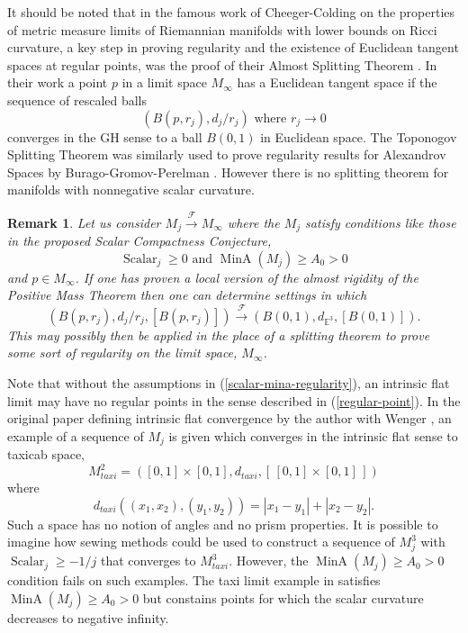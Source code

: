 \documentclass[12pt]{amsart}
\newtheorem{rmrk}[thm]{Remark}
\begin{document}
It should be noted that in the famous work of Cheeger-Colding on the properties
of metric measure limits of Riemannian manifolds with lower bounds on 
Ricci curvature, a key step in proving regularity and the existence of
Euclidean tangent spaces at regular points, was the proof of their Almost Splitting
Theorem \cite{ChCo-PartI}.  In their work a point $p$ in a limit space $M_\infty$ 
has a Euclidean tangent space if the sequence of
rescaled balls
\begin{equation}
(B(p,r_j), d_j/r_j)\textrm{ where } r_j \to 0
\end{equation}
converges in the GH sense to a ball $B(0,1)$ in Euclidean space.
The Toponogov Splitting Theorem 
was similarly used to prove regularity results for
Alexandrov Spaces by Burago-Gromov-Perelman \cite{BGP}. 
However there is no splitting theorem for manifolds with 
nonnegative scalar curvature.

\begin{rmrk}\label{rmrk-regularity}
Let us consider $M_j {\stackrel {\mathcal{F}}{\longrightarrow} } M_\infty$ where the $M_j$ satisfy conditions
like those in the proposed Scalar Compactness Conjecture,
\begin{equation}\label{scalar-mina-regularity}
{\operatorname{Scalar}}_j \ge 0 \textrm{ and } {\operatorname{MinA}}(M_j) \ge A_0>0
\end{equation}
 and $p\in M_\infty$.
If one has proven a local version of the almost rigidity of the Positive Mass
Theorem then one can determine settings in which 
\begin{equation}\label{regular-point}
(B(p,r_j), d_j/r_j, [B(p,r_j)]) {\stackrel {\mathcal{F}}{\longrightarrow} } (B(0,1), d_{{\mathbb{E}}^3}, [B(0,1)]).
\end{equation}
This may possibly then be applied in the place of a splitting theorem
to prove some sort of regularity on the limit space, $M_\infty$.  
\end{rmrk}

Note that without the assumptions in (\ref{scalar-mina-regularity}), an intrinsic
flat limit may have no regular points in the sense described in
(\ref{regular-point}).   In the original paper defining intrinsic flat convergence
by the author with Wenger \cite{SorWen2}, an example of a sequence of
$M_j$ is given which converges in the intrinsic flat sense to taxicab space,
\begin{equation}
M^2_{taxi}=([0,1]\times[0,1], d_{taxi}, [ \, [0,1]\times[0,1] \, ])
\end{equation} where
\begin{equation}
d_{taxi}\left((x_1,x_2), (y_1, y_2)\right)=|x_1-y_1|+|x_2-y_2|.
\end{equation}
Such a space has no notion of angles and no prism properties.   It is possible
to imagine how sewing methods could be used to construct a sequence of
$M_j^3$ with ${\operatorname{Scalar}}_j \ge -1/j$ that converges to $M^3_{taxi}$.   However, the ${\operatorname{MinA}}(M_j) \ge A_0>0$ condition fails on such examples.  The taxi limit example
in \cite{SorWen2} satisfies ${\operatorname{MinA}}(M_j) \ge A_0>0$ but constains points for
which the scalar curvature decreases to negative infinity.
\end{document}
